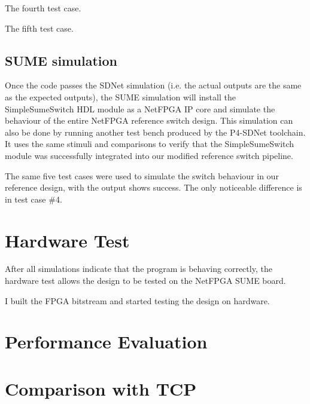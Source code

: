 The fourth test case.

The fifth test case.

\subsection{SUME simulation}
Once the code passes the SDNet simulation (i.e. the actual outputs are the same as the expected outputs), the SUME simulation will install the SimpleSumeSwitch HDL module as a NetFPGA IP core and simulate the behaviour of the entire NetFPGA reference switch design. This simulation can also be done by running another test bench produced by the P4-SDNet toolchain. It uses the same stimuli and comparisons to verify that the SimpleSumeSwitch module was successfully integrated into our modified reference switch pipeline. 

The same five test cases were used to simulate the switch behaviour in our reference design, with the output shows success. The only noticeable difference is in test case \#4. 

\section{Hardware Test}
After all simulations indicate that the program is behaving correctly, the hardware test allows the design to be tested on the NetFPGA SUME board. 

I built the FPGA bitstream and started testing the design on hardware.

\section{Performance Evaluation}
\section{Comparison with TCP}

